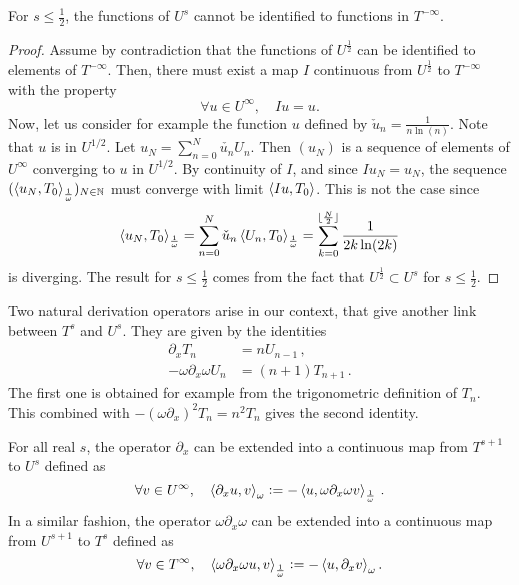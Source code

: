 \documentclass[a4paper]{article}
\begin{document}
\begin{Lem}
	For $s \leq \frac{1}{2}$, the functions of $U^s$ cannot be identified to functions in $T^{-\infty}$. 	
\end{Lem}
\begin{proof}
	Assume by contradiction that the functions of $U^{\frac{1}{2}}$ can be identified to elements of $T^{-\infty}$. Then, there must exist a map $I$ continuous from $U^{\frac{1}{2}}$ to $T^{-\infty}$ with the property 
	\[\forall u \in U^{\infty}, \quad Iu = u.\]
	Now, let us consider for example the function $u$ defined by $\check{u}_n = \frac{1}{n \ln(n)}$. Note that $u$ is in $U^{1/2}$. Let $u_N = \sum_{n = 0}^{N} \check{u_n}U_n$. Then $(u_N)$ is a sequence of elements of $U^{\infty}$ converging to $u$ in $U^{1/2}$. By continuity of $I$, and since $I u_N = u_N$, the sequence $(\left\langle u_N,T_0\right\rangle_\frac{1}{\omega})_{N\in \mathbb{N}}$ must converge with limit $\left\langle Iu,T_0\right\rangle$. This is not the case since 
	\[\left\langle u_N,T_0\right\rangle_\frac{1}{\omega} = \sum_{n=0}^{N} \check{u}_n\left\langle U_n,T_0\right\rangle_\frac{1}{\omega} = \sum_{k = 0}^{\lfloor \frac{N}{2} \rfloor} \frac{1}{2k \ln(2k)} \]
	is diverging. The result for $s \leq \frac{1}{2}$ comes from the fact that $U^{\frac{1}{2}} \subset U^{s}$ for $s \leq \frac{1}{2}$. 
\end{proof}
Two natural derivation operators arise in our context, that give another link between $T^s$ and $U^s$. They are given by the identities 
\begin{align}
	\partial_x T_n &= n U_{n-1}\,, \label{der1} \\
	-\omega \partial_x \omega U_n &= (n+1)T_{n+1}\,. \label{der2}
\end{align}
The first one is obtained for example from the trigonometric definition of $T_n$. This combined with $-(\omega \partial_x)^2 T_n = n^2 T_n$ gives the second identity. 
\begin{Def}
	\label{derivations}
	For all real $s$, the operator $\partial_x$ can be extended into a continuous map from $T^{s+1}$ to $U^{s}$ defined as 
	\[\forall v \in U^{\infty}, \quad \left\langle \partial_x u,v\right\rangle_{\omega} \mathrel{\mathop:}= -\left\langle u,\omega \partial_x \omega v\right\rangle_{\frac{1}{\omega}} \,.\] 
	In a similar fashion, the  operator $\omega \partial_x \omega$ can be extended into a continuous map from $U^{s+1}$ to $T^{s}$ defined as
	\[\forall v \in T^{\infty}, \quad \left\langle \omega \partial_x \omega u,v\right\rangle_\frac{1}{\omega} \mathrel{\mathop:}= -\left\langle u,\partial_x v\right\rangle_\omega.\]
\end{Def}
\end{document}
